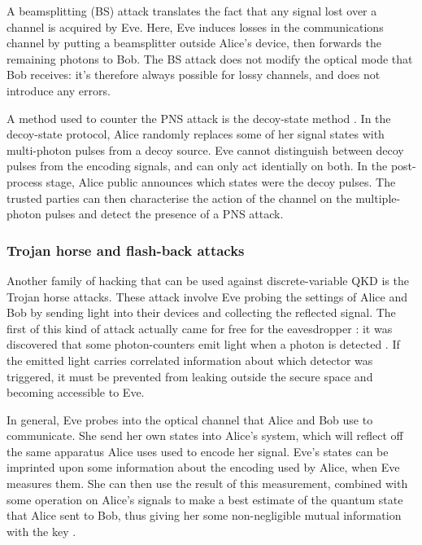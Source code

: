 A beamsplitting (BS) attack translates the fact that any signal lost over a channel is acquired by Eve. Here, Eve induces losses in the communications channel by putting a beamsplitter outside Alice's device, then forwards the remaining photons to Bob. The BS attack does not modify the optical mode that Bob receives: it's therefore always possible for lossy channels, and does not introduce any errors.


A method used to counter the PNS attack is the decoy-state method \cite{bib:PhysRevLett.91.057901, bib:PhysRevLett.94.230504} . In the decoy-state protocol, Alice randomly replaces some of her signal states with multi-photon pulses from a decoy source. Eve cannot distinguish between decoy pulses from the encoding signals, and can only act identially on both. In the post-process stage, Alice public announces which states were the decoy pulses. The trusted parties can then characterise the action of the channel on the multiple-photon pulses and detect the presence of a PNS attack.


\subsubsection{Trojan horse and flash-back attacks}

Another family of hacking that can be used against discrete-variable QKD is the Trojan horse attacks.
These attack involve Eve probing the settings of Alice and Bob by sending light into their devices and collecting the reflected signal. The first of this kind of attack actually came for free for the eavesdropper \cite{bib:RevModPhys.81.1301}: it was discovered that some photon-counters emit light when a photon is detected \cite{bib:kurtsiefer2001breakdown}. If the emitted light carries correlated information about which detector was triggered, it must be prevented from leaking outside the secure space and becoming accessible to Eve.

In general, Eve probes into the optical channel that Alice and Bob use to communicate. She send her own states into Alice's system, which will reflect off the same apparatus Alice uses used to encode her signal. Eve's states can be imprinted upon some information about the encoding used by Alice, when Eve measures them. She can then use the result of this measurement, combined with some operation on Alice's signals to make a best estimate of the quantum state that Alice sent to Bob, thus giving her some non-negligible mutual information with the key \cite{bib:PhysRevA.97.042335}.



